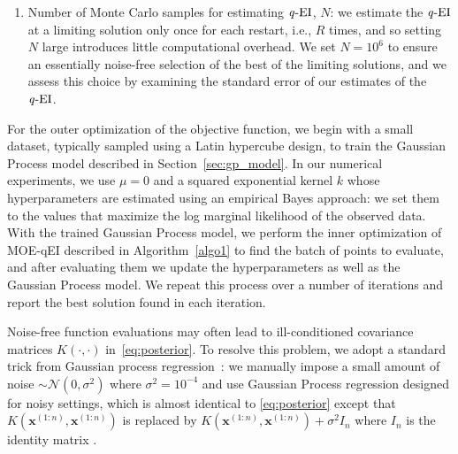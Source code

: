 \documentclass[paper=letter]{scrartcl}
\newcommand{\x}[1]{\bm{x}^{(#1)}}
\newcommand{\qEI}{\text{\textit q-EI}}
\begin{document}
\begin{enumerate}
We set $M=1000$ and as discussed in Section~\ref{sec:optimization_qEI} performed an experiment to justify this setting.
While we ran our experiments on a CPU except where otherwise stated to ensure a fair comparison with other competing algorithms, for which a GPU implementation is not available, 
the \enquote{MOE} software package provides a GPU implementation that can be used to increase the amount of parallelism used in MOE-qEI.
When using the GPU implementation, we recommend setting $M=10^6$ because the GPU's parallelism makes averaging a large number of independent replicates fast, and the reduction in noise reduces the number of iterates needed for convergence by stochastic gradient ascent.
\item
Number of Monte Carlo samples for estimating $\qEI$, $N$: we estimate the $\qEI$ at a limiting solution only once for each restart, i.e., $R$ times, and so setting $N$ large introduces little computational overhead.  We set $N=10^6$ to ensure an essentially noise-free selection of the best of the limiting solutions, and we assess this choice by examining the standard error of our estimates of the $\qEI$.
\end{enumerate}

For the outer optimization of the objective function, we begin with a small dataset, typically sampled using a Latin hypercube design, to train the Gaussian Process model described in Section~\ref{sec:gp_model}. In our numerical experiments, we use $\mu=0$ and a squared exponential kernel $k$ whose hyperparameters are estimated using an empirical Bayes approach: we set them to the values that maximize the log marginal likelihood of the observed data.
With the trained Gaussian Process model, we perform the inner optimization of MOE-qEI described in Algorithm~\ref{algo1} to find the batch of points to evaluate, and after evaluating them we update the hyperparameters as well as the Gaussian Process model. We repeat this process over a number of iterations and report the best solution found in each iteration.

Noise-free function evaluations may often lead to ill-conditioned covariance matrices $K(\cdot,\cdot)$ in~\eqref{eq:posterior}. To resolve this problem, we adopt a standard trick from Gaussian process regression~\cite[Section~3.4.3]{RaWi06}: we manually impose a small amount of noise $\sim \mathcal{N}(0, \sigma^2)$ where $\sigma^2 = 10^{-4}$ and use Gaussian Process regression designed for noisy settings, which is almost identical to \eqref{eq:posterior} except that $K(\x{1:n},\x{1:n})$ is replaced by $K(\x{1:n},\x{1:n}) + \sigma^2 I_n$ where $I_n$ is the identity matrix \cite[Section~2.2]{RaWi06}.
\end{document}
